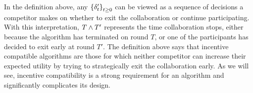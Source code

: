 In the definition above, any 
\(
    \left\{
        \delta'_{t}
    \right\}_{t\geq 0}
\)
can be viewed as a sequence of decisions a competitor makes on whether to exit the collaboration or
continue participating.
With this interpretation,
\(
    T\wedge T'
\)
represents the time collaboration stops, either because the algorithm has terminated on round $T$, or one of 
the participants has decided to exit early at round $T'$.
The definition above says that incentive compatible algorithms are those for which neither competitor
can increase their expected utility by trying to strategically exit the collaboration early.
As we will see, incentive compatibility is a strong requirement for an algorithm and significantly
complicates its design.